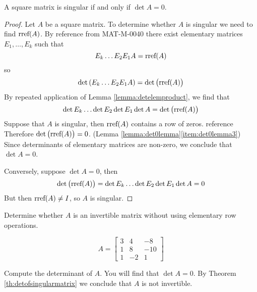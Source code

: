 \documentclass{ximera}
\begin{document}
\begin{theorem}\label{th:detofsingularmatrix}
A square matrix is singular if and only if $\det{A}=0$.
\end{theorem}
\begin{proof}
Let $A$ be a square matrix.  To determine whether $A$ is singular we need to find $\textnormal{rref}(A)$.  By {\color{red}reference from MAT-M-0040} there exist elementary matrices $E_1,\ldots ,E_k$ such that 
$$E_k\ldots E_2E_1A=\textnormal{rref}(A)$$
so
$$\det{(E_k\ldots E_2E_1A)}=\det{\big(\textnormal{rref}(A)\big)}$$
By repeated application of Lemma \ref{lemma:detelemproduct}, we find that 
$$\det{E_k}\ldots \det{E_2}\det{E_1}\det{A}=\det{\big(\textnormal{rref}(A)\big)}$$
Suppose that $A$ is singular, then $\textnormal{rref}(A)$ contains a row of zeros. {\color{red}reference} Therefore $\det{\big(\textnormal{rref}(A)\big)}=0$. (Lemma \ref{lemma:det0lemma}\ref{item:det0lemma3})  Since determinants of elementary matrices are non-zero, we conclude that $\det{A}=0$.

Conversely, suppose $\det{A}=0$, then
$$\det{\big(\textnormal{rref}(A)\big)}=\det{E_k}\ldots \det{E_2}\det{E_1}\det{A}=0$$
But then $\textnormal{rref}(A)\neq I$, so $A$ is singular.
\end{proof}
\begin{example} Determine whether $A$ is an invertible matrix without using elementary row operations.

$$A=\begin{bmatrix}3&4&-8\\1&8&-10\\1&-2&1\end{bmatrix}$$
\begin{explanation}
Compute the determinant of $A$.  You will find that $\det{A}=0$.  By Theorem \ref{th:detofsingularmatrix} we conclude that $A$ is not invertible.
\end{explanation}
\end{example}
\end{document}

